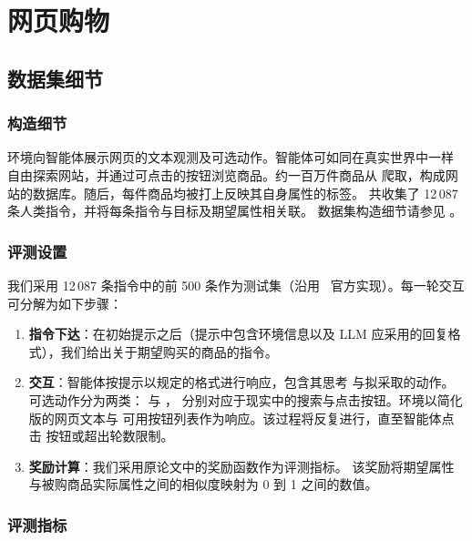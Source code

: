 
\section{网页购物}\label{app:ws}

\subsection{数据集细节}

\subsubsection*{构造细节}

环境向智能体展示网页的文本观测及可选动作。智能体可如同在真实世界中一样
自由探索网站，并通过可点击的按钮浏览商品。约一百万件商品从 
爬取，构成网站的数据库。随后，每件商品均被打上反映其自身属性的标签。
共收集了 12\,087 条人类指令，并将每条指令与目标及期望属性相关联。
数据集构造细节请参见 \citet{yao2022webshop}。

\subsubsection*{评测设置}

我们采用 12\,087 条指令中的前 500 条作为测试集（沿用
\citet{yao2022webshop}~官方实现）。每一轮交互可分解为如下步骤：
\begin{enumerate}
    \item \textbf{指令下达}：在初始提示之后（提示中包含环境信息以及 LLM
          应采用的回复格式），我们给出关于期望购买的商品的指令。
    \item \textbf{交互}：智能体按提示以规定的格式进行响应，包含其思考
          与拟采取的动作。可选动作分为两类： 与 ，
          分别对应于现实中的搜索与点击按钮。环境以简化版的网页文本与
          可用按钮列表作为响应。该过程将反复进行，直至智能体点击
           按钮或超出轮数限制。
    \item \textbf{奖励计算}：我们采用原论文中的奖励函数作为评测指标。
          该奖励将期望属性与被购商品实际属性之间的相似度映射为 0 到 1
          之间的数值。
\end{enumerate}

\subsubsection*{评测指标}

